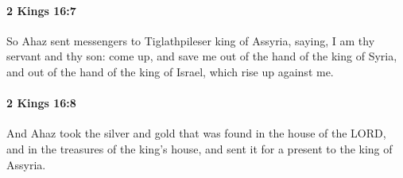 		\paragraph{2 Kings 16:7} %
			\label{2KINGS-16-7}

			So Ahaz sent messengers to Tiglathpileser king of Assyria, saying, I am thy servant and thy son: come up, and save me out of the hand of the king of Syria, and out of the hand of the king of Israel, which rise up against me.


		\paragraph{2 Kings 16:8} %
			\label{2KINGS-16-8}

			And Ahaz took the silver and gold that was found in the house of the LORD, and in the treasures of the king’s house, and sent it for a present to the king of Assyria.

